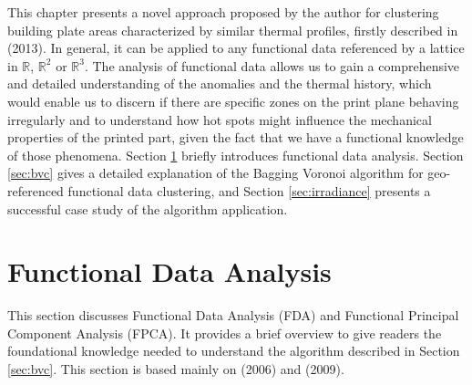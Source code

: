This chapter presents a novel approach proposed by the author for clustering building plate areas characterized by similar thermal profiles, firstly described in \citeauthor{secchi_bagging_2013} (2013). In general, it can be applied to any functional data referenced by a lattice in $\mathbb{R}$, $\mathbb{R}^2$ or $\mathbb{R}^3$. The analysis of functional data allows us to gain a comprehensive and detailed understanding of the anomalies and the thermal history, which would enable us to discern if there are specific zones on the print plane behaving irregularly and to understand how hot spots might influence the mechanical properties of the printed part, given the fact that we have a functional knowledge of those phenomena. Section \ref{sec:fda} briefly introduces functional data analysis. Section \ref{sec:bvc} gives a detailed explanation of the Bagging Voronoi algorithm for geo-referenced functional data clustering, and Section \ref{sec:irradiance} presents a successful case study of the algorithm application.

\section{Functional Data Analysis}
\label{sec:fda}
This section discusses Functional Data Analysis (FDA) and Functional Principal Component Analysis (FPCA). It provides a brief overview to give readers the foundational knowledge needed to understand the algorithm described in Section \ref{sec:bvc}. This section is based mainly on \citeauthor{ramsay_functional_2006} (2006) and \citeauthor{ramsay_functional_2009} (2009).

